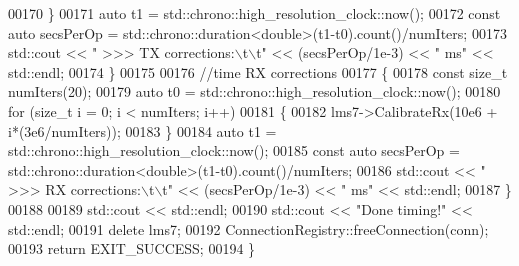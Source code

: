 \begin{DoxyCode}
00170         \}
00171         \textcolor{keyword}{auto} t1 = std::chrono::high\_resolution\_clock::now();
00172         \textcolor{keyword}{const} \textcolor{keyword}{auto} secsPerOp = std::chrono::duration<double>(t1-t0).count()/numIters;
00173         std::cout << \textcolor{stringliteral}{"  >>> TX corrections:\(\backslash\)t\(\backslash\)t"} << (secsPerOp/1e-3) << \textcolor{stringliteral}{" ms"} << std::endl;
00174     \}
00175 
00176     \textcolor{comment}{//time RX corrections}
00177     \{
00178         \textcolor{keyword}{const} \textcolor{keywordtype}{size\_t} numIters(20);
00179         \textcolor{keyword}{auto} t0 = std::chrono::high\_resolution\_clock::now();
00180         \textcolor{keywordflow}{for} (\textcolor{keywordtype}{size\_t} i = 0; i < numIters; i++)
00181         \{
00182             lms7->CalibrateRx(10e6 + i*(3e6/numIters));
00183         \}
00184         \textcolor{keyword}{auto} t1 = std::chrono::high\_resolution\_clock::now();
00185         \textcolor{keyword}{const} \textcolor{keyword}{auto} secsPerOp = std::chrono::duration<double>(t1-t0).count()/numIters;
00186         std::cout << \textcolor{stringliteral}{"  >>> RX corrections:\(\backslash\)t\(\backslash\)t"} << (secsPerOp/1e-3) << \textcolor{stringliteral}{" ms"} << std::endl;
00187     \}
00188 
00189     std::cout << std::endl;
00190     std::cout << \textcolor{stringliteral}{"Done timing!"} << std::endl;
00191     \textcolor{keyword}{delete} lms7;
00192     ConnectionRegistry::freeConnection(conn);
00193     \textcolor{keywordflow}{return} EXIT\_SUCCESS;
00194 \}
\end{DoxyCode}
